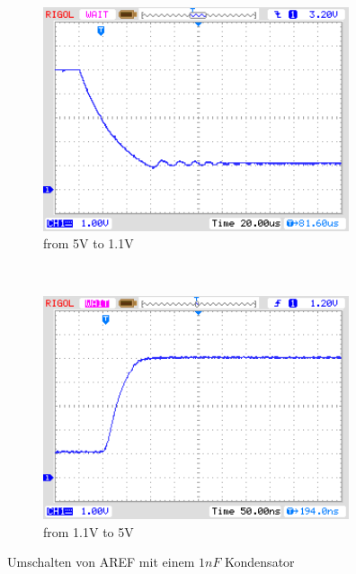 \begin{figure}[H]
  \begin{subfigure}[b]{9cm}
    \centering
    \includegraphics[width=9cm]{../PNG/AREF2_1V.png}
    \caption{from 5V to 1.1V }
    \label{pic:aref1}
  \end{subfigure}
  ~
  \begin{subfigure}[b]{9cm}
    \centering
    \includegraphics[width=9cm]{../PNG/AREF2VCC.png}
    \caption{from 1.1V to 5V}
    \label{pic:aref5}
  \end{subfigure}
  \caption{Umschalten von AREF mit einem \(1nF\) Kondensator}
\end{figure}

